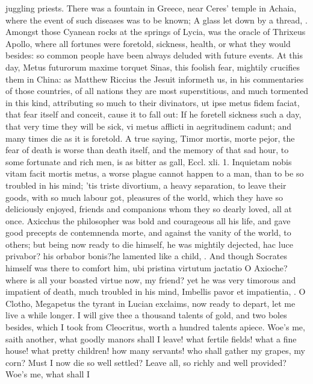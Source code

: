 {juggling priests. There was a fountain in Greece, near Ceres'
temple in Achaia, where the event of such diseases was to be known; A
glass let down by a thread, \etc{}. Amongst those Cyanean rocks at the
springs of Lycia, was the oracle of Thrixeus Apollo, where all fortunes
were foretold, sickness, health, or what they would besides: so common
people have been always deluded with future events. At this day, Metus
futurorum maxime torquet Sinas, this foolish fear, mightily crucifies
them in China: as Matthew Riccius the Jesuit informeth us, in his
commentaries of those countries, of all nations they are most
superstitious, and much tormented in this kind, attributing so much to
their divinators, ut ipse metus fidem faciat, that fear itself and
conceit, cause it to fall out: If he foretell sickness such a
day, that very time they will be sick, vi metus afflicti in
aegritudinem cadunt; and many times die as it is foretold. A true
saying, Timor mortis, morte pejor, the fear of death is worse than
death itself, and the memory of that sad hour, to some fortunate and
rich men, is as bitter as gall, Eccl. xli. 1. Inquietam nobis vitam
facit mortis metus, a worse plague cannot happen to a man, than to be
so troubled in his mind; 'tis triste divortium, a heavy separation, to
leave their goods, with so much labour got, pleasures of the world,
which they have so deliciously enjoyed, friends and companions whom
they so dearly loved, all at once. Axicchus the philosopher was bold
and courageous all his life, and gave good precepts de contemnenda
morte, and against the vanity of the world, to others; but being now
ready to die himself, he was mightily dejected, hac luce privabor? his
orbabor bonis?he lamented like a child, \etc{}. And though Socrates
himself was there to comfort him, ubi pristina virtutum jactatio O
Axioche? where is all your boasted virtue now, my friend? yet he was
very timorous and impatient of death, much troubled in his mind,
Imbellis pavor et impatientia, \etc{}. O Clotho, Megapetus the tyrant in
Lucian exclaims, now ready to depart, let me live a while longer.
I will give thee a thousand talents of gold, and two boles
besides, which I took from Cleocritus, worth a hundred talents apiece.
Woe's me,  saith another, what goodly manors shall I leave! what
fertile fields! what a fine house! what pretty children! how many
servants! who shall gather my grapes, my corn? Must I now die so well
settled? Leave all, so richly and well provided? Woe's me, what shall I
}
